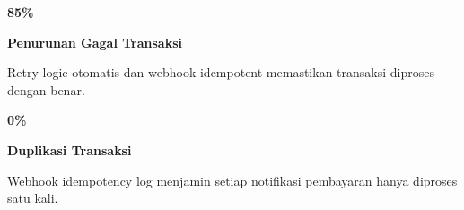 \documentclass[a4paper]{article}
\begin{document}
\noindent
\begin{minipage}[t]{0.485\textwidth}
    \noindent\colorbox{BlueBg}{%
        \begin{minipage}[t]{\dimexpr\linewidth-2\fboxsep}
            \vspace{6pt}
            {\fontsize{20}{24}\selectfont\bfseries\color{GreenPrimary} 85\%}\par\vspace{2pt}
            {\fontsize{9.5}{12}\selectfont\bfseries\color{BlueDark} Penurunan Gagal Transaksi}\par\vspace{2pt}
            {\fontsize{8.5}{11}\selectfont\color{TextDark}Retry logic otomatis dan webhook idempotent memastikan transaksi diproses dengan benar.}%
            \vspace{6pt}
        \end{minipage}}%
    \vspace{6pt}
    \noindent\colorbox{BlueBg}{%
        \begin{minipage}[t]{\dimexpr\linewidth-2\fboxsep}
            \vspace{6pt}
            {\fontsize{20}{24}\selectfont\bfseries\color{GreenPrimary} 0\%}\par\vspace{2pt}
            {\fontsize{9.5}{12}\selectfont\bfseries\color{BlueDark} Duplikasi Transaksi}\par\vspace{2pt}
            {\fontsize{8.5}{11}\selectfont\color{TextDark}Webhook idempotency log menjamin setiap notifikasi pembayaran hanya diproses satu kali.}%
            \vspace{6pt}
        \end{minipage}}%
\end{minipage}%
\hfill
\end{document}
